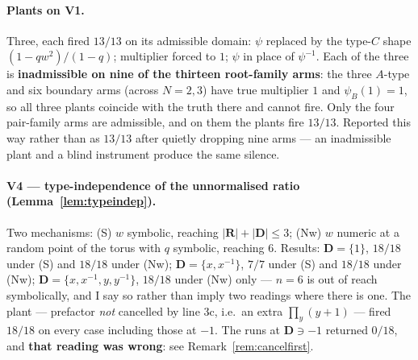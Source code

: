 \documentclass[11pt]{article}
\theoremstyle{definition}
\newcommand{\bD}{\mathbf{D}}
\newcommand{\bR}{\mathbf{R}}
\begin{document}
\paragraph{Plants on V1.}  Three, each fired $13/13$ on its admissible domain:
$\psi$ replaced by the type-$C$ shape $(1-qw^{2})/(1-q)$; multiplier forced to
$1$; $\psi$ in place of $\psi^{-1}$.  Each of the three is
\textbf{inadmissible on nine of the thirteen root-family arms}: the three
$A$-type and six boundary arms (across $N=2,3$) have true multiplier $1$ and
$\psi_B(1)=1$, so all three plants coincide with the truth there and cannot
fire.  Only the four pair-family arms are admissible, and on them the plants
fire $13/13$.  Reported this way rather than as $13/13$ after quietly dropping
nine arms --- an inadmissible plant and a blind instrument produce the same
silence.

\paragraph{V4 --- type-independence of the unnormalised ratio
(Lemma~\ref{lem:typeindep}).}  Two mechanisms: (S) $w$ symbolic, reaching
$|\bR|+|\bD|\le3$; (Nw) $w$ numeric at a random point of the torus with $q$
symbolic, reaching $6$.  Results: $\bD=\{1\}$, $18/18$ under (S) and $18/18$
under (Nw); $\bD=\{x,x^{-1}\}$, $7/7$ under (S) and $18/18$ under (Nw);
$\bD=\{x,x^{-1},y,y^{-1}\}$, $18/18$ under (Nw) only --- $n=6$ is out of reach
symbolically, and I say so rather than imply two readings where there is one.
The plant --- prefactor \emph{not} cancelled by line 3c, i.e.\ an extra
$\prod_y(y+1)$ --- fired $18/18$ on every case including those at $-1$.  The
runs at $\bD\ni-1$ returned $0/18$, and \textbf{that reading was wrong}: see
Remark~\ref{rem:cancelfirst}.
\end{document}
